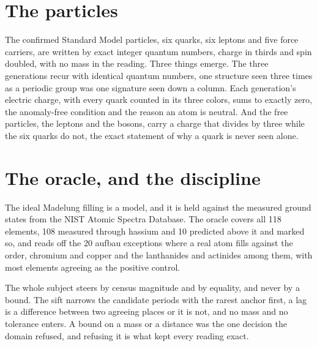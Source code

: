 \section{The particles}

The confirmed Standard Model particles, six quarks, six leptons and five force carriers, are written by
exact integer quantum numbers, charge in thirds and spin doubled, with no mass in the reading. Three
things emerge. The three generations recur with identical quantum numbers, one structure seen three
times as a periodic group was one signature seen down a column. Each generation's electric charge, with
every quark counted in its three colors, sums to exactly zero, the anomaly-free condition and the reason
an atom is neutral. And the free particles, the leptons and the bosons, carry a charge that divides by
three while the six quarks do not, the exact statement of why a quark is never seen alone.

\section{The oracle, and the discipline}

The ideal Madelung filling is a model, and it is held against the measured ground states from the NIST
Atomic Spectra Database. The oracle covers all 118 elements, 108 measured through hassium and 10
predicted above it and marked so, and reads off the 20 aufbau exceptions where a real atom fills against
the order, chromium and copper and the lanthanides and actinides among them, with most elements agreeing
as the positive control.

The whole subject steers by census magnitude and by equality, and never by a bound. The sift narrows the
candidate periods with the rarest anchor first, a lag is a difference between two agreeing places or it
is not, and no mass and no tolerance enters. A bound on a mass or a distance was the one decision the
domain refused, and refusing it is what kept every reading exact.
